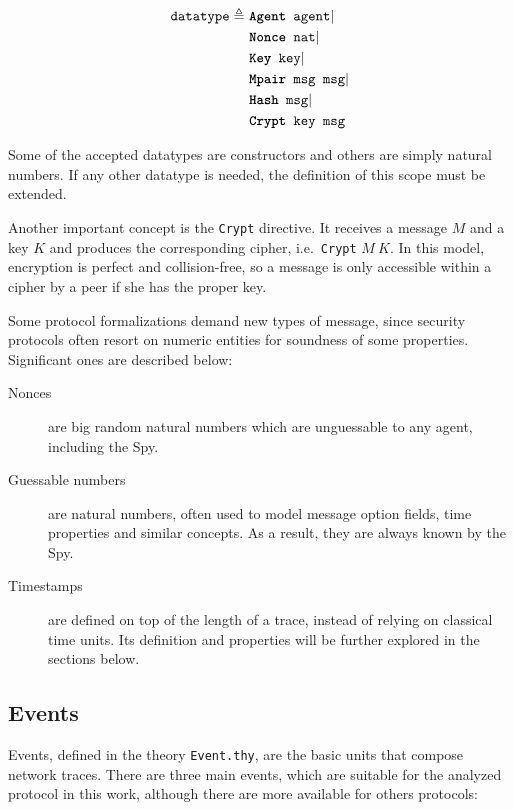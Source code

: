 \begin{equation*}
  \begin{split}
    \texttt{datatype} \triangleq\
    & \texttt{\textbf{Agent} agent} | \\
    & \texttt{\textbf{Nonce} nat} | \\
    & \texttt{\textbf{Key} key} | \\
    & \texttt{\textbf{Mpair} msg msg} | \\
    & \texttt{\textbf{Hash} msg} | \\
    & \texttt{\textbf{Crypt} key msg}
  \end{split}
\end{equation*}

Some of the accepted datatypes are constructors and others are simply natural numbers. If any other datatype is needed, the definition of this scope must be extended.

Another important concept is the \texttt{Crypt} directive. It receives a message \(M\) and a key \(K\) and produces the corresponding cipher, i.e.\ \texttt{Crypt} \(M\ K\). In this model, encryption is perfect and collision-free, so a message is only accessible within a cipher by a peer if she has the proper key.

Some protocol formalizations demand new types of message, since security protocols often resort on numeric entities for soundness of some properties. Significant ones are described below:

\begin{description}
  \item[Nonces] are big random natural numbers which are unguessable to any agent, including the Spy.

  \item[Guessable numbers] are natural numbers, often used to model message option fields, time properties and similar concepts. As a result, they are always known by the Spy.

  \item[Timestamps] are defined on top of the length of a trace, instead of relying on classical time units. Its definition and properties will be further explored in the sections below.
\end{description}



\subsection{Events}
Events, defined in the theory \texttt{Event.thy}, are the basic units that compose network traces. There are three main events, which are suitable for the analyzed protocol in this work, although there are more available for others protocols:

